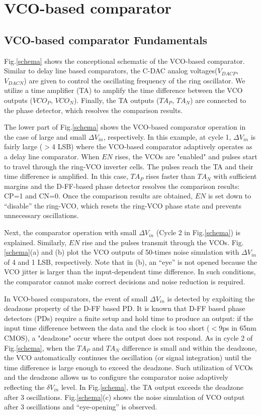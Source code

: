 \documentclass[letterpaper, 10 pt, conference]{ieeeconf}  %
\begin{document}
\section{VCO-based comparator}
\subsection{VCO-based comparator Fundamentals}
Fig.\ref{schema} shows the conceptional schematic of the VCO-based comparator. Similar to delay line based comparators\cite{agnes20089}, the C-DAC analog voltages($V_{DACP}$, $V_{DACN}$) are given to control the oscillating frequency of the ring oscillator. We utilize a time amplifier (TA)\cite{lee20089} to amplify the time difference between the VCO outputs ($VCO_P$, $VCO_N$). Finally, the TA outputs ($TA_P$, $TA_N$) are connected to the phase detector, which resolves the comparison results.

The lower part of Fig.\ref{schema} shows the VCO-based comparator operation in the case of large and small $\Delta V_{in}$, respectively. In this example, at cycle 1, $\Delta V_{in}$ is fairly large ($>$4 LSB) where the VCO-based comparator adaptively operates as a delay line comparator. When $EN$ rises, the VCOs are "enabled" and pulses start to travel through the ring-VCO inverter cells. The pulses reach the TA and their time difference is amplified. In this case, $TA_P$ rises faster than $TA_N$ with sufficient margins and the D-FF-based phase detector resolves the comparison results: CP=1 and CN=0. Once the comparison results are obtained, $EN$ is set down to “disable” the ring-VCO, which resets the ring-VCO phase state and prevents unnecessary oscillations.

Next, the comparator operation with small $\Delta V_{in}$ (Cycle 2 in Fig.\ref{schema}) is explained. Similarly, $EN$ rise and the pulses transmit through the VCOs. Fig.\ref{schema}(a) and (b) plot the VCO outputs of 50-times noise simulation with $\Delta V_{in}$ of 4 and 1 LSB, respectively. Note that in (b), an “eye” is not opened because the VCO jitter is larger than the input-dependent time difference. In such conditions, the comparator cannot make correct decisions and noise reduction is required.

In VCO-based comparators, the event of small $\Delta V_{in}$ is detected by exploiting the deadzone property of the D-FF based PD. It is known that D-FF based phase detectors (PDs) require a finite setup and hold time to produce an output: if the input time difference between the data and the clock is too short ($<$9ps in 65nm CMOS), a "deadzone" occur where the output does not respond.
As in cycle 2 of Fig.\ref{schema}, when the $TA_P$ and $TA_N$ difference is small and within the deadzone, the VCO automatically continues the oscillation (or signal integration) until the time difference is large enough to exceed the deadzone. Such utilization of VCOs and the deadzone allows us to configure the comparator noise adaptively reflecting the $\delta V_{in}$ level.
In Fig.\ref{schema}, the TA output exceeds the deadzone after 3 oscillations. Fig.\ref{schema}(c) shows the noise simulation of VCO output after 3 oscillations and “eye-opening” is observed.
\end{document}
